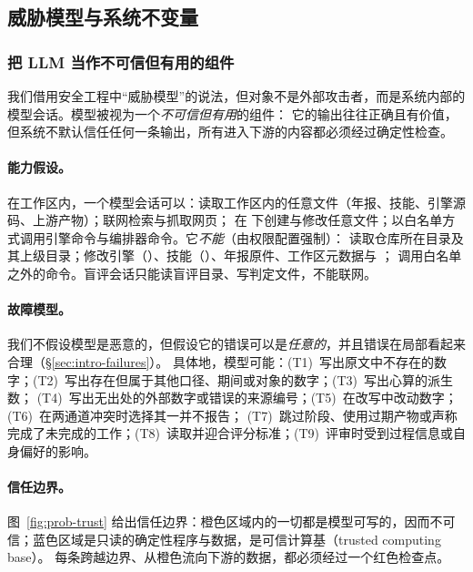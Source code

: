 \subsection{威胁模型与系统不变量}
\label{sec:prob-threat}

\subsubsection{把 LLM 当作不可信但有用的组件}
我们借用安全工程中“威胁模型”的说法，但对象不是外部攻击者，而是系统内部的模型会话。模型被视为一个\emph{不可信但有用}的组件：
它的输出往往正确且有价值，但系统不默认信任任何一条输出，所有进入下游的内容都必须经过确定性检查。

\paragraph{能力假设。}
在工作区内，一个模型会话可以：读取工作区内的任意文件（年报、技能、引擎源码、上游产物）；联网检索与抓取网页；
在  下创建与修改任意文件；以白名单方式调用引擎命令与编排器命令。它\emph{不能}（由权限配置强制）：
读取仓库所在目录及其上级目录；修改引擎（）、技能（）、年报原件、工作区元数据与 ；
调用白名单之外的命令。盲评会话只能读盲评目录、写判定文件，不能联网。

\paragraph{故障模型。}
我们不假设模型是恶意的，但假设它的错误可以是\emph{任意的}，并且错误在局部看起来合理（\S\ref{sec:intro-failures}）。
具体地，模型可能：(T1)~写出原文中不存在的数字；(T2)~写出存在但属于其他口径、期间或对象的数字；(T3)~写出心算的派生数；
(T4)~写出无出处的外部数字或错误的来源编号；(T5)~在改写中改动数字；(T6)~在两通道冲突时选择其一并不报告；
(T7)~跳过阶段、使用过期产物或声称完成了未完成的工作；(T8)~读取并迎合评分标准；(T9)~评审时受到过程信息或自身偏好的影响。

\paragraph{信任边界。}
图~\ref{fig:prob-trust} 给出信任边界：橙色区域内的一切都是模型可写的，因而不可信；蓝色区域是只读的确定性程序与数据，是可信计算基（trusted computing base）。
每条跨越边界、从橙色流向下游的数据，都必须经过一个红色检查点。

